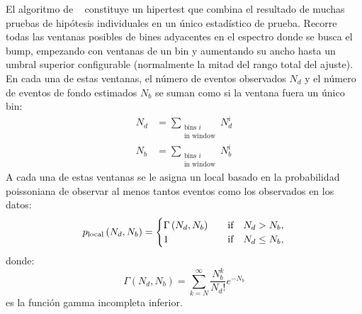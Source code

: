 El algoritmo de \bh~\cite{BumpHunter,pyBumpHunter} constituye un hipertest que combina el resultado de muchas pruebas de hipótesis individuales en un único estadístico de prueba. Recorre todas las ventanas posibles de bines adyacentes en el espectro donde se busca el bump, empezando con ventanas de un bin y aumentando su ancho hasta un umbral superior configurable (normalmente la mitad del rango total del ajuste). En cada una de estas ventanas, el número de eventos observados \(N_d\) y el número de eventos de fondo estimados \(N_b\) se suman como si la ventana fuera un único bin:
\begin{align}
    N_d &= \sum_{ \substack{ \text{bins \(i\)} \\ \text{in window} } } N_d^i\\
    N_b &= \sum_{ \substack{ \text{bins \(i\)} \\ \text{in window} } } N_b^i
\end{align}
A cada una de estas ventanas se le asigna un \pval local basado en la probabilidad poissoniana de observar al menos tantos eventos como los observados en los datos:
\begin{equation}
    p_{\text{local}} \left(N_d, N_b\right) = 
    \begin{cases}
        \Gamma \left(N_d, N_b\right)    &\qif   N_d > N_b,\\
        1                               &\qif   N_d \leq N_b,
    \end{cases}
\end{equation}
donde:
\begin{equation}
    \Gamma \left(N_d, N_b\right) = \sum_{k=N}^{\infty} \frac{N_b^k}{N_d!} e^{-N_b}
\end{equation}
es la función gamma incompleta inferior.

